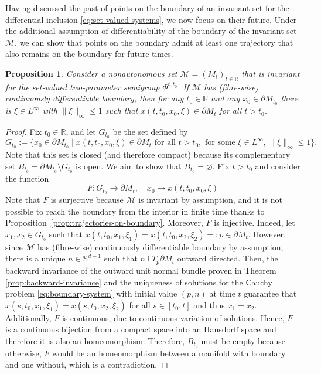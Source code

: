 \documentclass[reqno]{amsart}
\newtheorem{prop}[thm]{Proposition}
\theoremstyle{definition}
\numberwithin{equation}{section}
\newcommand{\R}{\mathbb{R}}
\newcommand{\M}{\mathscr{M}}
\begin{document}
Having discussed the past of points on the boundary of an invariant set for the differential inclusion \eqref{eq:set-valued-systems}, we now focus on their future. 
Under the additional assumption of differentiability of the boundary of the invariant set $\M$, we can show that points on the boundary admit at least one trajectory that also remains on the boundary for future times.
\begin{prop}\label{prop:boundary-forward-invariant}
    Consider a nonautonomous set $\M=(M_t)_{t\in\R}$ that is invariant for the set-valued two-parameter semigroup $\Phi^{t,t_0}$. If $\M$ has (fibre-wise) continuously differentiable boundary, then for any $t_0\in\R$ and any $x_0\in \partial M_{t_0}$  there is $\xi\in L^\infty$ with $\|\xi\|_\infty\le1$ such that $x(t,t_0,x_0,\xi)\in\partial M_t$  for all $t>t_0$.
\end{prop}
\begin{proof}
Fix $t_0\in\R$, and let $G_{t_0}$ be the set defined by 
\[
G_{t_0}:=\{x_0\in\partial M_{t_0}\mid x(t,t_0,x_0,\xi)\in\partial M_t\text{ for all }t>t_0, \text{ for some }
\xi\in L^\infty,\, \|\xi\|_\infty\le1\}.
\]
Note that this set is closed (and therefore compact) because its complementary set $B_{t_0}=\partial M_{t_0}\setminus G_{t_0}$ is open. We aim to show that $B_{t_0}=\varnothing$. Fix $t>t_0$ and consider the function 
\[
F:G_{t_0}\to\partial M_t, \quad x_0\mapsto x(t,t_0,x_0,\xi)
\]
Note that $F$ is surjective because $\M$ is invariant by assumption, and it is not possible to reach the boundary from the interior in finite time thanks to Proposition~\ref{prop:trajectories-on-boundary}.
Moreover, $F$ is  injective. Indeed,  let $x_1,x_2\in G_{t_0}$ such that $x(t,t_0,x_1,\xi_1)=x(t,t_0,x_2,\xi_2)=:p\in \partial M_t$. However, since $\M$ has (fibre-wise) continuously differentiable boundary by assumption, there is a unique $n\in\mathbb{S}^{d-1}$ such that $n\bot T_p\partial M_t$ outward directed. Then, the backward invariance of the outward unit normal bundle proven in Theorem \ref{prop:backward-invariance} and the uniqueness of solutions for the Cauchy problem \eqref{eq:boundary-system} with initial value $(p,n)$ at time $t$ guarantee that $x(s,t_0,x_1,\xi_1)=x(s,t_0,x_2,\xi_2)$ for all $s\in[t_0,t]$ and thus $x_1=x_2$. Additionally, $F$ is continuous, due to continuous variation of solutions. Hence, $F$ is a continuous bijection from a compact space into an Hausdorff space and therefore it is also an homeomorphism. Therefore, $B_{t_0}$ must be empty because otherwise, $F$ would be an homeomorphism between a manifold with boundary and one without, which is a contradiction.
\end{proof}
\end{document}
